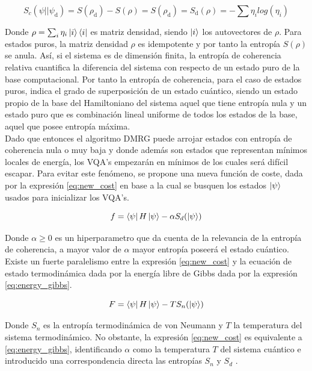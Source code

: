 \begin{equation}
    S_{c}(\psi||\psi_\textrm{d})=S(\rho_\textrm{d})-S(\rho) = S(\rho_\textrm{d})=S_\textrm{d}(\rho) = - \sum \eta_{i} log(\eta_{i})
    \label{eq:s_r}
\end{equation}

Donde $\rho=\sum_{i} \eta_{i} \ket{i}\bra{i}$ es matriz densidad, siendo $\ket{i}$ los autovectores de $\rho$. Para estados puros, la matriz densidad $\rho$ es idempotente y por tanto la entropía $S(\rho)$ se anula. Así, si el sistema es de dimensión finita, la entropía de coherencia relativa cuantifica la diferencia del sistema con respecto de un estado puro de la base computacional. Por tanto la entropía de coherencia, para el caso de estados puros, indica el grado de superposición de un estado cuántico, siendo un estado propio de la base del Hamiltoniano del sistema aquel que tiene entropía nula y un estado puro que es combinación lineal uniforme de todos los estados de la base, aquel que posee entropía máxima.\\

Dado que entonces el algoritmo DMRG puede arrojar estados con entropía de coherencia nula o muy baja y donde además son estados que representan mínimos locales de energía, los VQA's empezarán en mínimos de los cuales será difícil escapar. Para evitar este fenómeno, se propone una nueva función de coste, dada por la expresión \ref{eq:new_cost} en base a la cual se busquen los estados $\ket{\psi}$ usados para inicializar los VQA's. 

\begin{equation}
    f = \bra{\psi}H\ket{\psi} - \alpha S_{d}(\ket{\psi})
    \label{eq:new_cost}
\end{equation}

Donde $\alpha\geq 0$ es un hiperparametro que da cuenta de la relevancia de la entropía de coherencia, a mayor valor de $\alpha$ mayor entropía poseerá el estado cuántico. Existe un fuerte paralelismo entre la expresión \ref{eq:new_cost} y la ecuación de estado termodinámica dada por la energía libre de Gibbs dada por la expresión \ref{eq:energy_gibbs}.

\begin{equation}
    F = \bra{\psi}H\ket{\psi} - T S_{n}(\ket{\psi})
    \label{eq:energy_gibbs}
\end{equation}

Donde $S_{n}$ es la entropía termodinámica de von Neumann y $T$ la temperatura del sistema termodinámico. No obstante, la expresión \ref{eq:new_cost} es equivalente a \ref{eq:energy_gibbs}, identificando $\alpha$ como la temperatura $T$ del sistema cuántico e introducido una correspondencia directa las entropías $S_{n}$  y $S_{d}$ \citep{polkovnikov}. 

